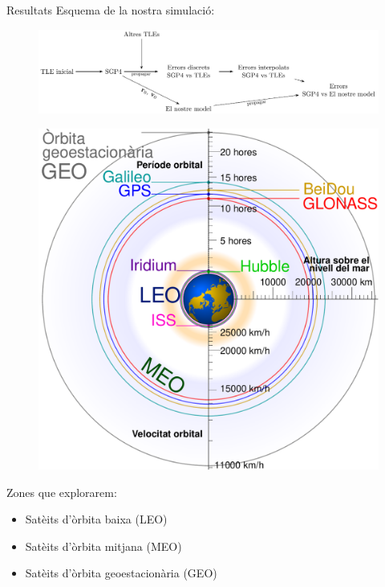 \documentclass{beamer} %
\begin{document}
\begin{frame}{Resultats}
  Esquema de la nostra simulació:
  \begin{figure}
    \centering
    \includegraphics[width=\textwidth]{../Images/simulation_scheme_ca.pdf}
  \end{figure}\pause
  \begin{minipage}{0.4\textwidth}
    \begin{figure}[ht]
      \centering
      \includegraphics[width=\textwidth]{../Images/satellite_orbits_custom_ca.pdf}
    \end{figure}
  \end{minipage}\hfill
  \begin{minipage}{0.55\textwidth}
    Zones que explorarem:
    \begin{itemize}
      \item Satè\lgem its d'òrbita baixa (LEO)
      \item Satè\lgem its d'òrbita mitjana (MEO)
      \item Satè\lgem its d'òrbita geoestacionària (GEO)
    \end{itemize}
  \end{minipage}
\end{frame}
\end{document}
